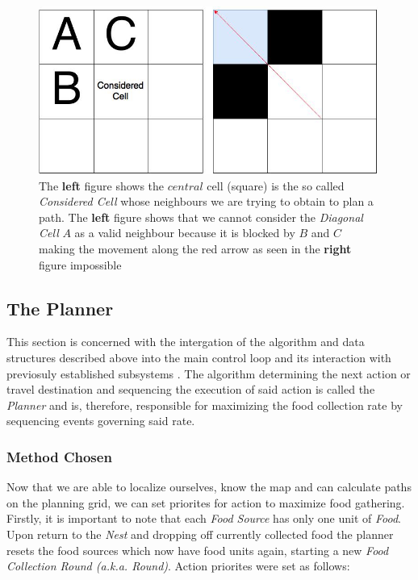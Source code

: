 \documentclass[11pt, a4paper]{article}
\begin{document}
\begin{figure}[H]
	  \centering
	  \includegraphics[width=30em]{../assets/fig_astar_diagonal.jpg}
          \caption{
            \label{fig:diagonalcell}
            The \textbf{left} figure shows the $central$ cell (square) is the so called \textit{Considered Cell} whose neighbours we are trying to obtain to plan a path. The \textbf{left} figure shows that we cannot consider the \textit{Diagonal Cell} $A$ as a valid neighbour because it is blocked by $B$ and $C$ making the movement along the red arrow as seen in the \textbf{right} figure impossible}
\end{figure} 









\subsection{The Planner}

This section is concerned with the intergation of the algorithm and data structures described above 
into the main control loop and its interaction with previosuly established subsystems 
\cite{task2_report}. The algorithm determining the next action or travel destination and sequencing 
the execution of said action is called the \textit{Planner} and is, therefore, responsible for 
maximizing the food collection rate by sequencing events governing said rate.

\subsubsection{Method Chosen}
\label{Planner_Principle}

Now that we are able to localize ourselves, know the map and can calculate paths on the planning 
grid, we can set priorites for action to maximize food gathering. Firstly, it is important to 
note that each \textit{Food Source} has only one unit of \textit{Food}. 
Upon return to the \textit{Nest} and dropping off currently collected food the planner resets the 
food sources which now have food units again, starting a new \textit{Food Collection 
Round (a.k.a. Round)}. Action priorites were set as follows:
\end{document}
